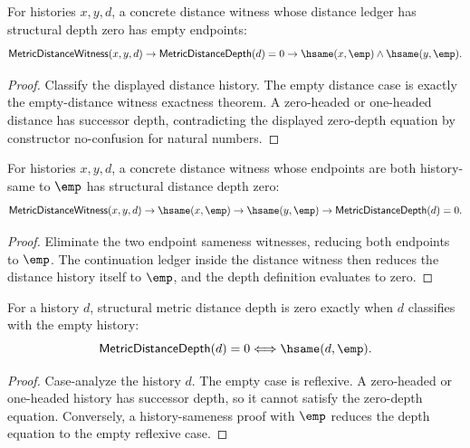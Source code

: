 \begin{theorem}
\label{thm:metric-distance-witness-depth-zero-empty-endpoints}
For histories $x,y,d$, a concrete distance witness whose distance ledger has
structural depth zero has empty endpoints:
$$
\mathsf{MetricDistanceWitness}(x,y,d)\to
\mathsf{MetricDistanceDepth}(d)=0\to
\hsame(x,\emp)\land\hsame(y,\emp).
$$
\end{theorem}
\begin{proof}
Classify the displayed distance history. The empty distance case is exactly the
empty-distance witness exactness theorem. A zero-headed or one-headed distance
has successor depth, contradicting the displayed zero-depth equation by
constructor no-confusion for natural numbers.
\end{proof}

\begin{theorem}
\label{thm:metric-distance-witness-empty-endpoints-depth-zero}
For histories $x,y,d$, a concrete distance witness whose endpoints are both
history-same to $\emp$ has structural distance depth zero:
$$
\mathsf{MetricDistanceWitness}(x,y,d)\to
\hsame(x,\emp)\to
\hsame(y,\emp)\to
\mathsf{MetricDistanceDepth}(d)=0.
$$
\end{theorem}
\begin{proof}
Eliminate the two endpoint sameness witnesses, reducing both endpoints to
$\emp$. The continuation ledger inside the distance witness then reduces the
distance history itself to $\emp$, and the depth definition evaluates to zero.
\end{proof}

\begin{theorem}
\label{thm:metric-distance-depth-zero-iff-empty}
For a history $d$, structural metric distance depth is zero exactly when $d$
classifies with the empty history:
$$
\mathsf{MetricDistanceDepth}(d)=0
\Longleftrightarrow
\hsame(d,\emp).
$$
\end{theorem}
\begin{proof}
Case-analyze the history $d$. The empty case is reflexive. A zero-headed or
one-headed history has successor depth, so it cannot satisfy the zero-depth
equation. Conversely, a history-sameness proof with $\emp$ reduces the depth
equation to the empty reflexive case.
\end{proof}

